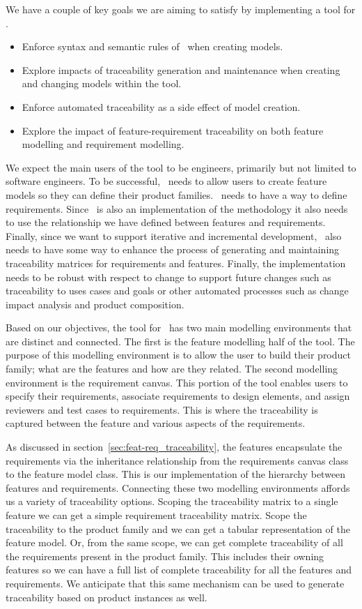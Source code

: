 We have a couple of key goals we are aiming to satisfy by implementing a tool for \tool. 

\begin{itemize}
	\item Enforce syntax and semantic rules of \tool\ when creating models.
	\item Explore impacts of traceability generation and maintenance when creating and changing models within the tool.
	\item Enforce automated traceability as a side effect of model creation.
	\item Explore the impact of feature-requirement traceability on both feature modelling and requirement modelling.
\end{itemize}

We expect the main users of the tool to be engineers, primarily but not limited to software engineers. To be successful, \tool\ needs to allow users to create feature models so they can define their product families. \tool\ needs to have a way to define requirements. Since \tool\ is also an implementation of the methodology it also needs to use the relationship we have defined between features and requirements. Finally, since we want to support iterative and incremental development, \tool\ also needs to have some way to enhance the process of generating and maintaining traceability matrices for requirements and features. Finally, the implementation needs to be robust with respect to change to support future changes such as traceability to uses cases and goals or other automated processes such as change impact analysis and product composition.

Based on our objectives, the tool for \tool\ has two main modelling environments that are distinct and connected. The first is the feature modelling half of the tool. The purpose of this modelling environment is to allow the user to build their product family; what are the features and how are they related. The second modelling environment is the requirement canvas. This portion of the tool enables users to specify their requirements, associate requirements to design elements, and assign reviewers and test cases to requirements. This is where the traceability is captured between the feature and various aspects of the requirements. 

As discussed in section~\ref{sec:feat-req_traceability}, the features encapsulate the requirements via the inheritance relationship from the requirements canvas class to the feature model class. This is our implementation of the hierarchy between features and requirements. Connecting these two modelling environments affords us a variety of traceability options. Scoping the traceability matrix to a single feature we can get a simple requirement traceability matrix. Scope the traceability to the product family and we can get a tabular representation of the feature model. Or, from the same scope, we can get complete traceability of all the requirements present in the product family. This includes their owning features so we can have a full list of complete traceability for all the features and requirements. We anticipate that this same mechanism can be used to generate traceability based on product instances as well.

